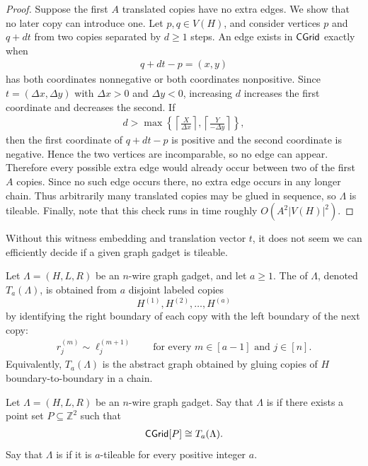\begin{proof}
Suppose the first $A$ translated copies have no extra edges. We show that no later copy can introduce one. Let $p,q\in V(H)$, and consider vertices $p$ and $q+dt$ from two copies separated by $d\geq 1$ steps. An edge exists in $\mathsf{CGrid}$ exactly when 
\begin{align}
    q+dt-p = (x,y)
\end{align}
has both coordinates nonnegative or both coordinates nonpositive. Since $t=(\Delta x,\Delta y)$ with $\Delta x>0$ and $\Delta y<0$, increasing $d$ increases the first coordinate and decreases the second. If 
\begin{align} 
    d> \max\left\{ \left\lceil \frac{X}{\Delta x} \right\rceil, \left\lceil \frac{Y}{-\Delta y} \right\rceil \right\}, 
\end{align}
then the first coordinate of $q+dt-p$ is positive and the second coordinate is negative. Hence the two vertices are incomparable, so no edge can appear. Therefore every possible extra edge would already occur between two of the first $A$ copies. Since no such edge occurs there, no extra edge occurs in any longer chain. Thus arbitrarily many translated copies may be glued in sequence, so $\Lambda$ is tileable. Finally, note that this check runs in time roughly $O(A^2|V(H)|^2)$.
\end{proof}

Without this witness embedding and translation vector $t$, it does not seem we can efficiently decide if a given graph gadget is tileable.

\begin{definition}
\label{def:a-chain-graph}
Let $\Lambda=(H,L,R)$ be an $n$-wire graph gadget, and let $a\geq 1$. The
 of $\Lambda$, denoted $T_a(\Lambda)$, is obtained from
$a$ disjoint labeled copies
\[
    H^{(1)},H^{(2)},\ldots,H^{(a)}
\]
by identifying the right boundary of each copy with the left boundary of the
next copy:
\begin{align}
    r^{(m)}_j \sim \ell^{(m+1)}_j
    \qquad
    \text{for every }m\in[a-1]\text{ and }j\in[n].
\end{align}
Equivalently, \(T_a(\Lambda)\) is the abstract graph obtained by gluing
copies of \(H\) boundary-to-boundary in a chain.
\end{definition}

\begin{definition}
\label{def:a-tileable}
Let $\Lambda=(H,L,R)$ be an $n$-wire graph gadget. Say that $\Lambda$ is
 if there exists a point set \(P\subseteq \mathbb Z^2\)
such that
\begin{align}
    \mathsf{CGrid}[P]\cong T_a(\Lambda).
\end{align}
Say that $\Lambda$ is  if it is $a$-tileable for every
positive integer \(a\).
\end{definition}

